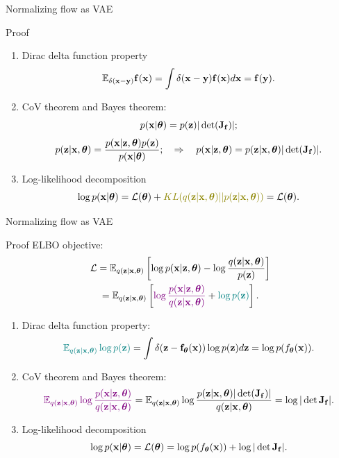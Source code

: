 \begin{frame}{Normalizing flow as VAE}
	\begin{block}{Proof}
		\begin{enumerate}
			\item Dirac delta function property 
			\[
				\mathbb{E}_{\delta(\mathbf{x} - \mathbf{y})} \mathbf{f}(\mathbf{x}) = \int \delta(\mathbf{x} - \mathbf{y}) \mathbf{f}(\mathbf{x}) d \mathbf{x} = \mathbf{f}(\mathbf{y}).
			\]
			\item CoV theorem and Bayes theorem:
			\[
				p(\mathbf{x} | \boldsymbol{\theta}) = p(\mathbf{z}) |\det (\mathbf{J}_{\mathbf{f}})|;
			\]
			\[
				p(\mathbf{z} | \mathbf{x}, \boldsymbol{\theta}) = \frac{p(\mathbf{x} | \mathbf{z}, \boldsymbol{\theta}) p(\mathbf{z})}{p(\mathbf{x} | \boldsymbol{\theta})}; \quad \Rightarrow \quad p(\mathbf{x} | \mathbf{z}, \boldsymbol{\theta}) = p(\mathbf{z} | \mathbf{x}, \boldsymbol{\theta}) |\det (\mathbf{J}_{\mathbf{f}})|.
			\]
			\item Log-likelihood decomposition
			\[
				\log p(\bx | \btheta) = \cL(\btheta) + {\color{olive}KL(q(\bz | \bx, \btheta) || p(\bz | \bx, \btheta))} = \cL(\btheta).
			\]
		\end{enumerate}
	\end{block}
\end{frame}
\begin{frame}{Normalizing flow as VAE}
	\begin{block}{Proof}
		ELBO objective:
		\vspace{-0.5cm}
		\begin{multline*}
			\mathcal{L}  = \mathbb{E}_{q(\mathbf{z} | \mathbf{x}, \boldsymbol{\theta})} \left[\log p(\mathbf{x} | \mathbf{z}, \boldsymbol{\theta}) - \log \frac{q(\mathbf{z} | \mathbf{x}, \boldsymbol{\theta})}{p(\mathbf{z})} \right]  \\
			= \mathbb{E}_{q(\mathbf{z} | \mathbf{x}, \boldsymbol{\theta})} \left[{\color{violet}\log \frac{p(\mathbf{x} | \mathbf{z}, \boldsymbol{\theta})}{q(\mathbf{z} | \mathbf{x}, \boldsymbol{\theta})}} + {\color{teal}\log p(\mathbf{z})} \right].
		\end{multline*}
		\vspace{-0.6cm}
		\begin{enumerate}
			\item  Dirac delta function property:
			\vspace{-0.3cm}
			\[
				{\color{teal}\mathbb{E}_{q(\mathbf{z} | \mathbf{x}, \boldsymbol{\theta})} \log p(\mathbf{z})} = \int \delta (\mathbf{z} - \mathbf{f}_{\boldsymbol{\theta}}(\mathbf{x})) \log p(\mathbf{z}) d \mathbf{z} = \log p(f_{\boldsymbol{\theta}}(\mathbf{x})).
			\]
			\vspace{-0.6cm}
			\item CoV theorem and Bayes theorem:
			\vspace{-0.2cm}
			{ \small
			\[ 
				{\color{violet}\mathbb{E}_{q(\mathbf{z} | \mathbf{x}, \boldsymbol{\theta})} \log \frac{p(\mathbf{x} | \mathbf{z}, \boldsymbol{\theta})}{q(\mathbf{z} | \mathbf{x}, \boldsymbol{\theta})}} = \mathbb{E}_{q(\mathbf{z} | \mathbf{x}, \boldsymbol{\theta})} \log \frac{p(\mathbf{z} | \mathbf{x}, \boldsymbol{\theta}) |\det (\mathbf{J}_{\mathbf{f}})|}{q(\mathbf{z} | \mathbf{x}, \boldsymbol{\theta})} = \log |\det \mathbf{J}_{\mathbf{f}}|.
			\]
			}
			\vspace{-0.6cm}
			\item Log-likelihood decomposition
			\vspace{-0.3cm}
			\[
				\log p(\mathbf{x} | \boldsymbol{\theta}) = \mathcal{L}(\boldsymbol{\theta}) = \log p(f_{\boldsymbol{\theta}}(\mathbf{x})) +  \log |\det \mathbf{J}_{\mathbf{f}}|.
			\]
		\end{enumerate}
	\end{block}
\end{frame}
